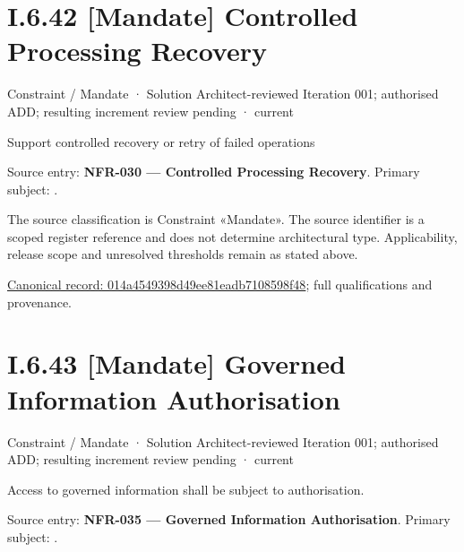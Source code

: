 \section*{I.6.42 [Mandate] Controlled Processing Recovery}
\label{navigation:I.6.42}

\label{element:014a4549398d49ee81eadb7108598f48}
{\small Constraint / Mandate · Solution Architect-reviewed Iteration 001; authorised ADD; resulting increment review pending · current}\par

Support controlled recovery or retry of failed operations



Source entry: \textbf{NFR-030 — Controlled Processing Recovery}. Primary subject: \texttt{}.



The source classification is Constraint «Mandate». The source identifier is a scoped register reference and does not determine architectural type. Applicability, release scope and unresolved thresholds remain as stated above.


{\footnotesize \href{../../../../../../../continuum/motivation/constraint/mandate/014a4549398d49ee81eadb7108598f48.md}{Canonical record: 014a4549398d49ee81eadb7108598f48}; full qualifications and provenance.}\par
\section*{I.6.43 [Mandate] Governed Information Authorisation}
\label{navigation:I.6.43}

\label{element:8812fcd52d3f4afcbeef41b60bda5874}
{\small Constraint / Mandate · Solution Architect-reviewed Iteration 001; authorised ADD; resulting increment review pending · current}\par

Access to governed information shall be subject to authorisation.



Source entry: \textbf{NFR-035 — Governed Information Authorisation}. Primary subject: \texttt{}.



